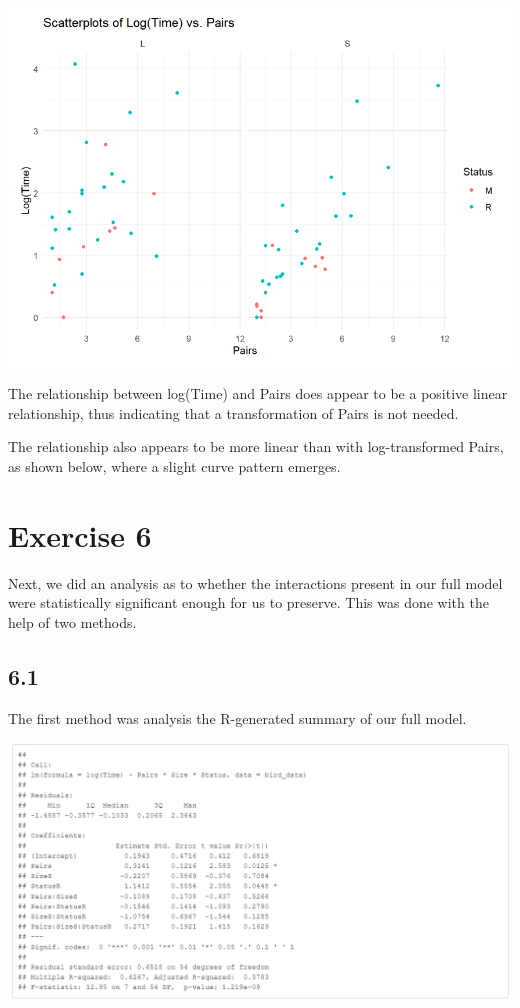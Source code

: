 \documentclass{article}
\begin{document}
\begin{center}
\includegraphics[scale=0.5]{graphs/graph5.png}
\end{center}

The relationship between log(Time) and Pairs does appear to be a positive linear relationship, thus indicating that a transformation of Pairs is not needed.

The relationship also appears to be more linear than with log-transformed Pairs, as shown below, where a slight curve pattern emerges.



\section{Exercise 6}

Next, we did an analysis as to whether the interactions present in our full model were statistically significant enough for us to preserve. This was done with the help of two methods.

\subsection*{6.1}
The first method was analysis the R-generated summary of our full model.
\begin{center}
\includegraphics[scale=0.5]{tables/log-time.png}
\end{center}
\end{document}
